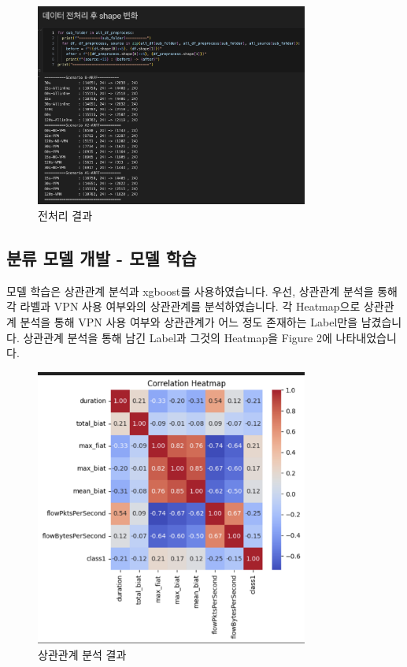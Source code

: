 \documentclass[14pt]{extarticle}
\begin{document}
\begin{figure}[h!]
    \centering
    \includegraphics[width=0.8\textwidth]{Photo_Preprocessing} %
    \caption{전처리 결과}
\end{figure}

\subsection{분류 모델 개발 - 모델 학습}

모델 학습은 상관관계 분석과 xgboost를 사용하였습니다.
우선, 상관관계 분석을 통해 각 라벨과 VPN 사용 여부와의 상관관계를 분석하였습니다.
각 Heatmap으로 상관관계 분석을 통해 VPN 사용 여부와 상관관계가 어느 정도 존재하는 Label만을 남겼습니다.
상관관계 분석을 통해 남긴 Label과 그것의 Heatmap을 Figure 2에 나타내었습니다.

\begin{figure}[h!]
    \centering
    \includegraphics[width=0.8\textwidth]{Photo_Heatmap}
    \caption{상관관계 분석 결과}
\end{figure}
\end{document}
